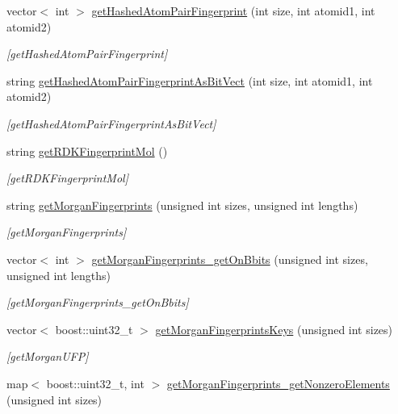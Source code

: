 \begin{DoxyCompactItemize}
vector$<$ int $>$ \mbox{\hyperlink{class_molecule_a12aeb95c7b163dd74d62cc6973d1197a}{get\+Hashed\+Atom\+Pair\+Fingerprint}} (int size, int atomid1, int atomid2)
\begin{DoxyCompactList}\small\item\em \mbox{[}get\+Hashed\+Atom\+Pair\+Fingerprint\mbox{]} \end{DoxyCompactList}\item 
string \mbox{\hyperlink{class_molecule_abc89b98816f2dc9666679cfb2e1eb696}{get\+Hashed\+Atom\+Pair\+Fingerprint\+As\+Bit\+Vect}} (int size, int atomid1, int atomid2)
\begin{DoxyCompactList}\small\item\em \mbox{[}get\+Hashed\+Atom\+Pair\+Fingerprint\+As\+Bit\+Vect\mbox{]} \end{DoxyCompactList}\item 
string \mbox{\hyperlink{class_molecule_aaace92222bb544e3682c894d4f1e9302}{get\+R\+D\+K\+Fingerprint\+Mol}} ()
\begin{DoxyCompactList}\small\item\em \mbox{[}get\+R\+D\+K\+Fingerprint\+Mol\mbox{]} \end{DoxyCompactList}\item 
string \mbox{\hyperlink{class_molecule_a78cd64d263c131ee0313917c023b940f}{get\+Morgan\+Fingerprints}} (unsigned int sizes, unsigned int lengths)
\begin{DoxyCompactList}\small\item\em \mbox{[}get\+Morgan\+Fingerprints\mbox{]} \end{DoxyCompactList}\item 
vector$<$ int $>$ \mbox{\hyperlink{class_molecule_ace01e8dc28ea916279af4905fa4a5d4c}{get\+Morgan\+Fingerprints\+\_\+get\+On\+Bbits}} (unsigned int sizes, unsigned int lengths)
\begin{DoxyCompactList}\small\item\em \mbox{[}get\+Morgan\+Fingerprints\+\_\+get\+On\+Bbits\mbox{]} \end{DoxyCompactList}\item 
vector$<$ boost\+::uint32\+\_\+t $>$ \mbox{\hyperlink{class_molecule_a773a68572aff26b0fa536588e562e87b}{get\+Morgan\+Fingerprints\+Keys}} (unsigned int sizes)
\begin{DoxyCompactList}\small\item\em \mbox{[}get\+Morgan\+U\+FP\mbox{]} \end{DoxyCompactList}\item 
map$<$ boost\+::uint32\+\_\+t, int $>$ \mbox{\hyperlink{class_molecule_aecd6b243dc5b420306cad9ba3a996101}{get\+Morgan\+Fingerprints\+\_\+get\+Nonzero\+Elements}} (unsigned int sizes)

\end{DoxyCompactItemize}
